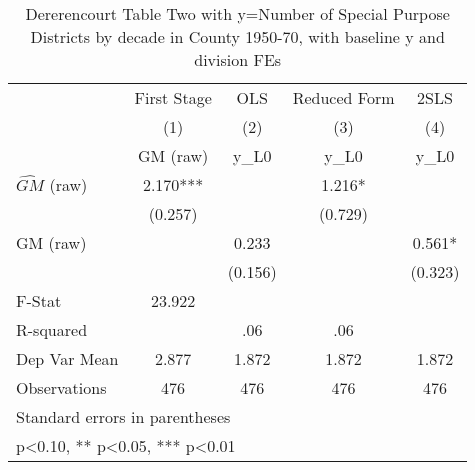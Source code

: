 \begin{table}[htbp]\centering
\def\sym#1{\ifmmode^{#1}\else\(^{#1}\)\fi}
\caption{Dererencourt Table Two with y=Number of Special Purpose Districts by decade in County 1950-70, with baseline y and division FEs}
\begin{tabular}{l*{4}{c}}
\toprule
                    & First Stage   &         OLS   &Reduced Form   &        2SLS   \\
                    &\multicolumn{1}{c}{(1)}&\multicolumn{1}{c}{(2)}&\multicolumn{1}{c}{(3)}&\multicolumn{1}{c}{(4)}\\
                    &\multicolumn{1}{c}{GM  (raw)}&\multicolumn{1}{c}{y\_L0}&\multicolumn{1}{c}{y\_L0}&\multicolumn{1}{c}{y\_L0}\\
\midrule
$\hat{GM}$ (raw)    &       2.170***&               &       1.216*  &               \\
                    &     (0.257)   &               &     (0.729)   &               \\
\addlinespace
GM  (raw)           &               &       0.233   &               &       0.561*  \\
                    &               &     (0.156)   &               &     (0.323)   \\
\midrule
F-Stat              &      23.922   &               &               &               \\
R-squared           &               &         .06   &         .06   &               \\
Dep Var Mean        &       2.877   &       1.872   &       1.872   &       1.872   \\
Observations        &         476   &         476   &         476   &         476   \\
\bottomrule
\multicolumn{5}{l}{\footnotesize Standard errors in parentheses}\\
\multicolumn{5}{l}{\footnotesize * p<0.10, ** p<0.05, *** p<0.01}\\
\end{tabular}
\end{table}
